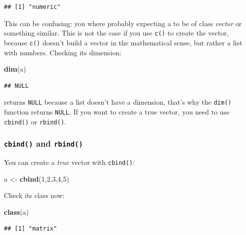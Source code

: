 \documentclass[]{gitbook}
\newenvironment{Shaded}{\begin{snugshade}}{\end{snugshade}}
\newcommand{\DecValTok}[1]{\textcolor[rgb]{0.00,0.00,0.81}{#1}}
\newcommand{\KeywordTok}[1]{\textcolor[rgb]{0.13,0.29,0.53}{\textbf{#1}}}
\newcommand{\NormalTok}[1]{#1}
\newcommand{\StringTok}[1]{\textcolor[rgb]{0.31,0.60,0.02}{#1}}
\theoremstyle{definition}
\theoremstyle{definition}
\theoremstyle{definition}
\theoremstyle{remark}
\begin{document}
\begin{verbatim}
## [1] "numeric"
\end{verbatim}

This can be confusing: you where probably expecting a to be of class
\emph{vector} or something similar. This is not the case if you use
\texttt{c()} to create the vector, because \texttt{c()} doesn't build a
vector in the mathematical sense, but rather a list with numbers.
Checking its dimension:

\begin{Shaded}
\begin{Highlighting}[]
\KeywordTok{dim}\NormalTok{(a)}
\end{Highlighting}
\end{Shaded}

\begin{verbatim}
## NULL
\end{verbatim}

returns \texttt{NULL} because a list doesn't have a dimension, that's
why the \texttt{dim()} function returns \texttt{NULL}. If you want to
create a true vector, you need to use \texttt{cbind()} or
\texttt{rbind()}.

\hypertarget{cbind-and-rbind}{%
\subsubsection{\texorpdfstring{\texttt{cbind()} and
\texttt{rbind()}}{cbind() and rbind()}}\label{cbind-and-rbind}}

You can create a \emph{true} vector with \texttt{cbind()}:

\begin{Shaded}
\begin{Highlighting}[]
\NormalTok{a <-}\StringTok{ }\KeywordTok{cbind}\NormalTok{(}\DecValTok{1}\NormalTok{,}\DecValTok{2}\NormalTok{,}\DecValTok{3}\NormalTok{,}\DecValTok{4}\NormalTok{,}\DecValTok{5}\NormalTok{)}
\end{Highlighting}
\end{Shaded}

Check its class now:

\begin{Shaded}
\begin{Highlighting}[]
\KeywordTok{class}\NormalTok{(a)}
\end{Highlighting}
\end{Shaded}

\begin{verbatim}
## [1] "matrix"
\end{verbatim}
\end{document}
